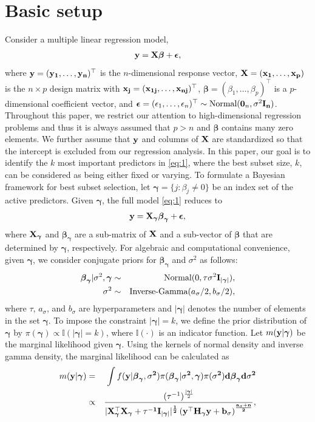 \documentclass[twocolumn]{svjour3}       %
\newcommand{\T}{\top} %
\newcommand{\uI}{\bf I} %
\newcommand{\uH}{\bf H} %
\newcommand{\uX}{\bf X} %
\newcommand{\ux}{\bf x} %
\newcommand{\uy}{\bf y} %
\newcommand{\0}{\boldsymbol 0} %
\newcommand{\1}{\boldsymbol 1} %
\newcommand{\ubeta}{\boldsymbol \beta} %
\newcommand{\bg}{\boldsymbol \gamma} %
\newcommand{\uepsilon}{\boldsymbol \epsilon} %
\begin{document}
\section{Basic setup}\label{sec:2}
Consider a multiple linear regression model,
\begin{eqnarray}\label{eq:1}
\uy = \uX\ubeta + \uepsilon,
\end{eqnarray}
where $\uy=(y_1,\ldots,y_n)^\T $ is the $n$-dimensional response vector, $\uX = (\ux_1,\ldots,\ux_p)$ is the $n\times p$ design matrix with $\ux_j=(x_{1j},\ldots, x_{nj})^\T$, $\ubeta = (\beta_1,\ldots,\beta_p)^{\T}$ is a $p$-dimensional coefficient vector, and $\uepsilon=(\epsilon_1,\ldots,\epsilon_n)^\T \sim \text{Normal}(\0_n, \sigma^2\uI_n)$. Throughout this paper, we restrict our attention to high-dimensional regression problems and thus it is always assumed that $p>n$ and $\ubeta$ contains many zero elements. We further assume that $\uy$ and columns of $\uX$ are standardized so that the intercept is excluded from our regression analysis. In this paper, our goal is to identify the $k$ most important predictors in \eqref{eq:1}, where the best subset size, $k$, can be considered as being either fixed or varying. To formulate a Bayesian framework for best subset selection, let $\bg=\{j:\beta_j\neq 0\}$ be an index set of the active predictors. Given $\bg$, the full model \eqref{eq:1} reduces  to
\begin{eqnarray*}
\uy = \uX_{\bg} \ubeta_{\bg} + \uepsilon,
\end{eqnarray*}
where $\uX_{\bg}$ and $\ubeta_{\bg}$ are a sub-matrix of $\uX$ and a sub-vector of $\ubeta$ that are determined by $\bg$, respectively. For algebraic and computational convenience, given $\bg$, we consider conjugate priors for $\ubeta_{\bg}$ and $\sigma^2$ as follows:
\begin{eqnarray*}
  \ubeta_{\bg}|\sigma^2,\bg &\sim&\text{Normal}(0,\tau \sigma^2 \uI_{|\bg|} ),\\
  \sigma^2 &\sim& \text{Inverse-Gamma}(a_{\sigma}/2,b_{\sigma}/2),
\end{eqnarray*} 
where $\tau$, $a_{\sigma}$, and $b_{\sigma}$ are hyperparameters and $|\bg|$ denotes the number of elements in the set $\bg$. To impose the constraint $|\bg|=k$, we define the prior distribution of $\bg$ by $\pi(\bg)\propto\mathbb{I}(|\bg|=k )$, where $\mathbb{I}(\cdot)$ is an indicator function. Let $m(\uy|\bg)$ be the marginal likelihood given $\bg$. Using the kernels of normal density and inverse gamma density, the marginal likelihood can be calculated as
\begin{eqnarray}\label{eq:2} 
m(\uy|\bg) &=&\int f(\uy|\ubeta_{\bg},\sigma^2)\pi(\ubeta_{\bg}|\sigma^2, \bg) \pi(\sigma^2) d{\ubeta_{\bg}} d{\sigma^2} \nonumber \\
&\propto& \frac{(\tau^{-1})^{\frac{|\bg|}{2}}}{|\uX_{\bg}^{\T}
    \uX_{\bg}+\tau^{-1}\uI_{|\bg|} |^{\frac{1}{2}}  \left(\uy^{\T}\uH_{\bg}
  \uy+b_{\sigma}\right)^{\frac{a_{\sigma}+n}{2}}},
\end{eqnarray}
\end{document}
